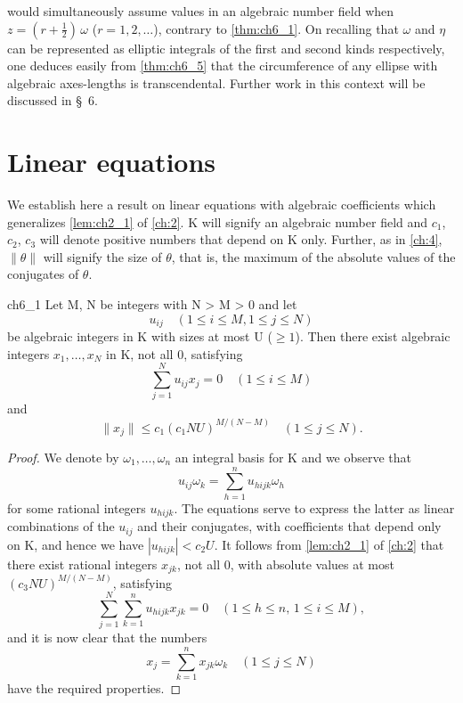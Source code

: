 would simultaneously assume values in an algebraic number field when $z=(r+\frac{1}{2})\,\omega$ ($r=1,2,\dots$), contrary to \autoref{thm:ch6_1}. On recalling that $\omega$ and $\eta$ can be represented as elliptic integrals of the first and second kinds respectively, one deduces easily from \autoref{thm:ch6_5} that the circumference of any ellipse with algebraic axes-lengths is transcendental. Further work in this context will be discussed in \S~6.

\section{Linear equations}\label{sec:ch6_3}

We establish here a result on linear equations with algebraic coefficients which generalizes \autoref{lem:ch2_1} of \autoref{ch:2}. K will signify an algebraic number field and $c_1$, $c_2$, $c_3$ will denote positive numbers that depend on K only. Further, as in \autoref{ch:4}, $\|\theta\|$ will signify the size of $\theta$, that is, the maximum of the absolute values of the conjugates of $\theta$.

\begin{mylemma}{}{ch6_1}
Let M, N be integers with N > M > 0 and let
\[u_{ij} \quad (1 \leqslant i \leqslant M, 1 \leqslant j \leqslant N)\]
be algebraic integers in K with sizes at most U ($\geqslant 1$). Then there exist algebraic integers $x_1, \dots, x_N$ in K, not all 0, satisfying
\[\sum_{j=1}^{N} u_{ij} x_j = 0 \quad (1 \leqslant i \leqslant M)\]
and
\[\|x_j\| \le c_1(c_1 N U)^{M/(N-M)} \quad (1 \le j \le N).\]
\end{mylemma}

\begin{proof}
We denote by $\omega_1, \dots, \omega_n$ an integral basis for K and we observe that
\[u_{ij}\omega_k = \sum_{h=1}^n u_{hijk}\omega_h\]
for some rational integers $u_{hijk}$. The equations serve to express the latter as linear combinations of the $u_{ij}$ and their conjugates, with coefficients that depend only on K, and hence we have $|u_{hijk}| < c_2 U$. It follows from \autoref{lem:ch2_1} of \autoref{ch:2} that there exist rational integers $x_{jk}$, not all 0, with absolute values at most $(c_3 NU)^{M/(N-M)}$, satisfying
\[\sum_{j=1}^{N}\sum_{k=1}^{n}u_{hijk}x_{jk}=0 \quad (1\leqslant h\leqslant n,\, 1\leqslant i\leqslant M),\]
and it is now clear that the numbers
\[x_j = \sum_{k=1}^n x_{jk} \omega_k \quad (1 \leqslant j \leqslant N)\]
have the required properties.
\end{proof}

